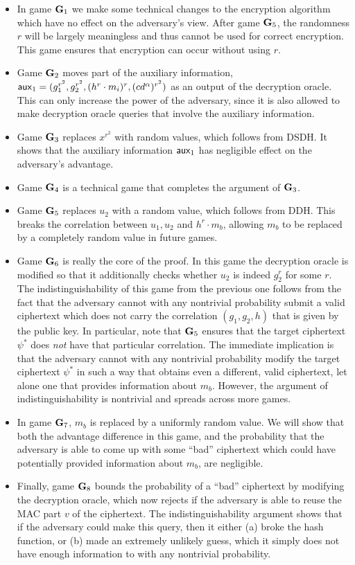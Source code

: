 \begin{itemize}
	\item In game $\mathbf{G}_1$ we make some technical changes to the encryption algorithm which have no effect on the adversary's view. After game $\mathbf{G}_5$, the randomness $r$ will be largely meaningless and thus cannot be used for correct encryption. This game ensures that encryption can occur without using $r$.
	\item Game $\mathbf{G}_2$ moves part of the auxiliary information, $\mathsf{aux}_1 =(g_1^{r^2}, g_2^{r^2},(h^r\cdot m_i)^{r},(cd^{\alpha})^{r^2})$ as an output of the decryption oracle. This can only increase the power of the adversary, since it is also allowed to make decryption oracle queries that involve the auxiliary information.
	\item Game $\mathbf{G}_3$ replaces $x^{r^2}$ with random values, which follows from DSDH. It shows that the auxiliary information $\mathsf{aux}_1$ has negligible effect on the adversary's advantage.
	\item Game $\mathbf{G}_4$ is a technical game that completes the argument of $\mathbf{G}_3$.
	\item Game $\mathbf{G}_5$ replaces $u_2$ with a random value, which follows from DDH. This breaks the correlation between $u_1, u_2$ and $h^r\cdot m_b$, allowing $m_b$ to be replaced by a completely random value in future games.
	\item Game $\mathbf{G}_6$ is really the core of the proof. In this game the decryption oracle is modified so that it additionally checks whether $u_2$ is indeed $g_2^r$ for some $r$. The indistinguishability of this game from the previous one follows from the fact that the adversary cannot with any nontrivial probability submit a valid ciphertext which does not carry the correlation $(g_1, g_2, h)$ that is given by the public key. In particular, note that $\mathbf{G}_5$ ensures that the target ciphertext $\psi^{*}$ does \textit{not} have that particular correlation. The immediate implication is that the adversary cannot with any nontrivial probability modify the target ciphertext $\psi^{*}$ in such a way that obtains even a different, valid ciphertext, let alone one that provides information about $m_b$. However, the argument of indistinguishability is nontrivial and spreads across more games.
	\item In game $\mathbf{G}_7$, $m_b$ is replaced by a uniformly random value. We will show that both the advantage difference in this game, and the probability that the adversary is able to come up with some ``bad'' ciphertext which could have potentially provided information about $m_b$, are negligible.
	\item Finally, game $\mathbf{G}_8$ bounds the probability of a ``bad'' ciphertext by modifying the decryption oracle, which now rejects if the adversary is able to reuse the MAC part $v$ of the ciphertext. The indistinguishability argument shows that if the adversary could make this query, then it either (a) broke the hash function, or (b) made an extremely unlikely guess, which it simply does not have enough information to with any nontrivial probability.
\end{itemize}

